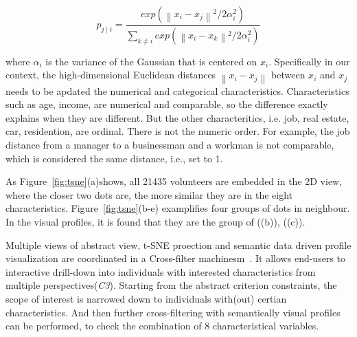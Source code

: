 \begin{equation}
p_{j\mid i} = \frac{exp({\left \| x_i - x_j \right \|}^2/2\alpha_i ^{2})}{\sum _{k\neq i}exp({\left \| x_i - x_k \right \|}^2/2\alpha_i ^{2})}
\end{equation}

where $\alpha_i$ is the variance of the Gaussian that is centered on $x_i$. Specifically in our context, the high-dimensional Euclidean distances $\left \| x_i - x_j \right \|$ between $x_i$ and $x_j$ needs to be apdated the numerical and categorical characteristics. Characteristics such as age, income, are numerical and comparable, so the difference exactly explains when they are different. But the other characteritics, i.e. job, real estate, car, residention, are ordinal. There is not the numeric order. For example, the job distance from a manager to a businessman and a workman is not comparable, which is considered the same distance, i.e., set to 1. 



As Figure~\ref{fig:tsne}(a)shows, all 21435 volunteers are embedded in the 2D view, where the closer two dots are, the more similar they are in the eight characteristics. Figure~\ref{fig:tsne}(b-e) examplifies four groups of dots in neighbour. In the visual profiles, it is found that they are the group of  ((b)),  ((c)). 

Multiple views of abstract view, t-SNE proection and semantic data driven profile visualization are coordinated in a Cross-filter machinesm~\cite{Weaver2010}. It allows end-users to interactive drill-down into individuals with interested characteristics from multiple perspectives(\textit{C3}). Starting from the abstract criterion constraints, the scope of interest is narrowed down to individuals with(out) certian characteristics. And then further cross-filtering with semantically visual profiles can be performed, to check the combination of 8 characteristical variables. 

